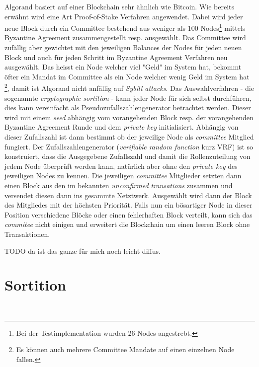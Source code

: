 \documentclass[11pt,a4paper]{article}
\begin{document}
Algorand basiert auf einer Blockchain sehr \"ahnlich wie Bitcoin.
Wie bereits erw\"ahnt wird eine Art Proof-of-Stake Verfahren angewendet.
Dabei wird jeder neue Block durch ein Committee bestehend aus weniger als 100 Nodes\footnote{Bei der Testimplementation wurden 26 Nodes angestrebt.} mittels Byzantine Agreement zusammengestellt resp. ausgewählt.
Das Committee wird zufällig aber gewichtet mit den jeweiligen Balances der Nodes für jeden neuen Block und auch für jeden Schritt im Byzantine Agreement Verfahren neu ausgew\"ahlt.
Das heisst ein Node welcher viel "Geld" im System hat, bekommt \"ofter ein Mandat im Committee als ein Node welcher wenig Geld im System hat \footnote{Es k\"onnen auch mehrere Committee Mandate auf einen einzelnen Node fallen.}, damit ist Algorand nicht anf\"allig auf \textit{Sybill attacks}.
Das Auswahlverfahren - die sogenannte \textit{cryptographic sortition} - kann jeder Node für sich selbst durchführen, dies kann vereinfacht als Pseudozufallszahlengenerator betrachtet werden.
Dieser wird mit einem \textit{seed} abhängig vom vorangehenden Block resp. der vorangehenden Byzantine Agreement Runde und dem \textit{private key} initialisiert.
Abh\"angig von dieser Zufallszahl ist dann bestimmt ob der jeweilige Node als \textit{committee} Mitglied fungiert.
Der Zufallszahlengenerator (\textit{verifiable random function} kurz VRF) ist so konstruiert,
dass die Ausgegebene Zufallszahl und damit die Rollenzuteilung von jedem Node \"uberpr\"uft werden kann,
nat\"urlich aber ohne den \textit{private key} des jeweiligen Nodes zu kennen.
Die jeweiligen \textit{committee} Mitglieder setzten dann einen Block aus den im bekannten \textit{unconfirmed transations} zusammen und versendet diesen dann ins gesammte Netztwerk.
Ausgewählt wird dann der Block des Mitgliedes mit der höchsten Priorität.
Falls nun ein b\"osartiger Node in dieser Position verschiedene Bl\"ocke oder einen fehlerhaften Block
verteilt, kann sich das \textit{commitee} nicht einigen und erweitert die Blockchain um einen leeren Block ohne Transaktionen.

TODO da ist das ganze für mich noch leicht diffus.

\chapter{\textbf{\Large Sortition}}\\

\newpage
\end{document}
